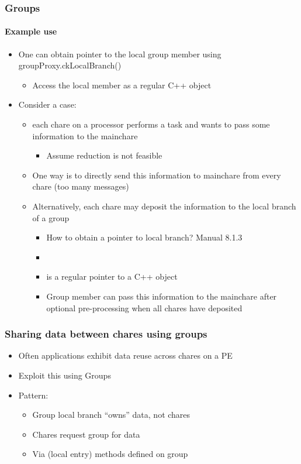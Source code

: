 \begin{frame}[fragile]
  \frametitle{Groups}
  \framesubtitle{Example use}
  \begin{itemize}
    \item  One can obtain pointer to the local group member using groupProxy.ckLocalBranch()
    \begin{itemize}
      \item Access the local member as a regular C++ object
    \end{itemize}
   \item Consider a case:
   \begin{itemize}
      \item each chare on a processor performs a task and wants to pass some information to the mainchare
      \begin{itemize}
         \item Assume reduction is not feasible
      \end{itemize}
      \item One way is to directly send this information to mainchare from every chare (too many messages)
      \item Alternatively, each chare may deposit the information to the local branch of a group
      \begin{itemize}
        \item How to obtain a pointer to local branch? Manual 8.1.3
        \item {}
        \item {} is a regular pointer to a C++ object
        \item Group member can pass this information to the mainchare after optional pre-processing when all chares have deposited 
      \end{itemize}
    \end{itemize}
  \end{itemize}
\end{frame}

\begin{frame}[fragile]
  \frametitle{Sharing data between chares using groups}
  \begin{itemize}
  \item Often applications exhibit data reuse across chares on a PE
  \item Exploit this using Groups
  \item Pattern:
    \begin{itemize}
    \item Group local branch ``owns'' data, not chares
    \item Chares request group for data
    \item Via (local entry) methods defined on group
    \end{itemize}
  \end{itemize}
\end{frame}

